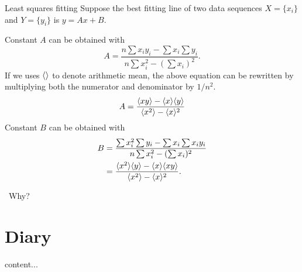 \documentclass[11pt,a4paper,fleqn]{article}
\numberwithin{equation}{section}
\newcommand{\TODO}{\textcolor{ErrorRed}{\fbox{TODO}}\ }
\DeclarePairedDelimiter\arithMean{\langle}{\rangle}
\begin{document}
\begin{fact}{Least squares fitting}{}
    Suppose the best fitting line of two data sequences $X = \{x_i\}$ and $Y = \{y_i\}$ is $y=Ax+B$.
    
    Constant $A$ can be obtained with
    \begin{equation*}
        A = \frac{n\sum x_i y_i - \sum x_i \sum y_i}{n \sum x_i^2 - (\sum x_i)^2}.
    \end{equation*}
    If we uses $\arithMean{}$ to denote arithmetic mean, the above equation can be rewritten by multiplying both the numerator and denominator by $1/n^2$.
    \begin{equation*}
        A = \frac{\arithMean{xy} -\arithMean{x}\arithMean{y}}{\arithMean{x^2}-\arithMean{x}^2}
    \end{equation*}
    Constant $B$ can be obtained with
    \begin{align*}
        B
        &= \frac{\sum x_i^2 \sum y_i - \sum x_i \sum x_i y_i}{n\sum x_i^2 - (\sum x_i)^2} \\
        &= \frac{\arithMean{x^2}\arithMean{y}-\arithMean{x}\arithMean{xy}}{\arithMean{x^2}-\arithMean{x}^2}.
    \end{align*}
    
\end{fact}

\TODO Why?

\section{Diary}

\begin{fact}{}{}
    content...
\end{fact}
\end{document}
